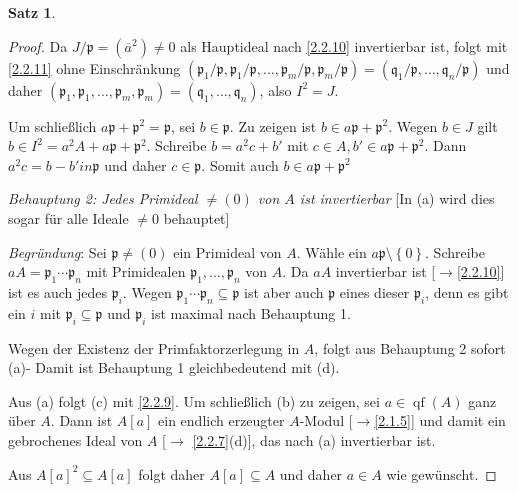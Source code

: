 \documentclass[
twoside=semi,
fontsize=12,
DIV=12, 
cleardoublepage=current,
leqno,
headings=optiontoheadandtoc, 
toc=idx
]{scrbook}
\newcommand{\set}[1]{\left\{ #1 \right\}}
\DeclareMathOperator{\qf}{qf}
\theoremstyle{definition}
\newtheorem{satz}[definition]{Satz}
\begin{document}
\begin{satz}
\begin{proof}
 			Da $J/\mathfrak{p} = (\overline{a}^2) \neq 0$ als Hauptideal nach \ref{2.2.10} invertierbar ist, folgt mit \ref{2.2.11} ohne Einschr\"ankung $(\mathfrak{p}_1/\mathfrak{p}, \mathfrak{p}_1/\mathfrak{p}, \dots, \mathfrak{p}_m/\mathfrak{p}, \mathfrak{p}_m/\mathfrak{p}) = (\mathfrak{q}_1/\mathfrak{p},\dots, \mathfrak{q}_n/\mathfrak{p})$  und daher 
 			$(\mathfrak{p}_1,\mathfrak{p}_1,\dots,\mathfrak{p}_m,\mathfrak{p}_m) = (\mathfrak{q}_1,\dots,\mathfrak{q}_n)$, also $I^2 = J$.
 			
 			Um schlie\ss lich $a\mathfrak{p} + \mathfrak{p}^2 = \mathfrak{p}$, sei $b \in \mathfrak{p}$. Zu zeigen ist $b \in a\mathfrak{p} + \mathfrak{p}^2$. Wegen $b \in J$ gilt $b \in I^2 = a^2A + a\mathfrak{p}+ \mathfrak{p}^2$. Schreibe $b = a^2c + b'$ mit $c \in A, b' \in a\mathfrak{p}+\mathfrak{p}^2$. Dann $a^2c = b - b' in \mathfrak{p}$ und daher $c \in \mathfrak{p}$. Somit auch $b \in a \mathfrak{p} + \mathfrak{p}^2$
 			
 			
 			\emph{Behauptung 2: Jedes Primideal $\neq (0)$ von $A$ ist invertierbar} [In (a) wird dies sogar f\"ur alle Ideale $\neq 0$ behauptet]
 			
 			\emph{Begr\"undung}: Sei $\mathfrak{p} \neq (0)$ ein Primideal von $A$. W\"ahle ein $a \mathfrak{p}\setminus \set{0}$. Schreibe $aA = \mathfrak{p}_1 \cdots \mathfrak{p}_n$ mit Primidealen $\mathfrak{p}_1,\dots, \mathfrak{p}_n$ von $A$. Da $aA$ invertierbar ist [$\to$\ref{2.2.10}] ist es auch jedes $\mathfrak{p}_i$. Wegen $\mathfrak{p}_1\cdots \mathfrak{p}_n \subseteq \mathfrak{p}$ ist aber auch $\mathfrak{p}$ eines dieser $\mathfrak{p}_i$, denn es gibt ein $i$ mit $\mathfrak{p}_i \subseteq \mathfrak{p}$ und $\mathfrak{p}_i$ ist maximal nach Behauptung 1.
 			
 			\vspace*{2mm}
 			
 			Wegen der Existenz der Primfaktorzerlegung in $A$, folgt aus Behauptung 2 sofort (a)- Damit ist Behauptung 1 gleichbedeutend mit (d). 
 			
 			Aus (a) folgt (c) mit \ref{2.2.9}. Um schlie\ss lich (b) zu zeigen, sei $a \in \qf(A)$ ganz \"uber $A$. Dann ist $A[a]$ ein endlich erzeugter $A$-Modul [$\to$\ref{2.1.5}] und damit ein gebrochenes Ideal von $A$ [$\to$ \ref{2.2.7}(d)], das nach (a) invertierbar ist. 
 			
 			Aus $A[a]^2 \subseteq A[a]$ folgt daher $A[a] \subseteq A$ und daher $a \in A$ wie gew\"unscht.
   		\end{proof}
   		\newpage
   		

\end{satz}
\end{document}
